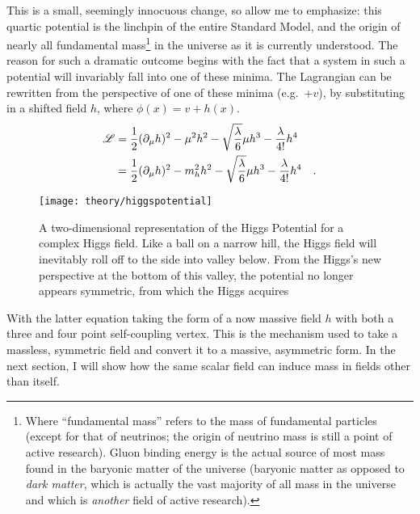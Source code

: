     This is a small, seemingly innocuous change, so allow me to emphasize:
        this quartic potential is the linchpin of the entire Standard Model,
        and the origin of nearly all fundamental mass\footnote{
            Where ``fundamental mass'' refers to the mass of fundamental particles
                (except for that of neutrinos; the origin of neutrino mass is still a point of active research).
            Gluon binding energy is the actual source of most mass found in the baryonic matter of the universe
                (baryonic matter as opposed to \textit{dark matter},
                which is actually the vast majority of all mass in the universe
                and which is \textit{another} field of active research).
        } in the universe as it is currently understood.
    The reason for such a dramatic outcome begins with the fact that
        a system in such a potential will invariably fall into one of these minima.
    The Lagrangian can be rewritten from the perspective of one of these minima (e.g.\ $+v$),
        by substituting in a shifted field $h$, where $\phi(x)=v+h(x)$.
    \begin{equation} \begin{split} \label{eq:basic_higgs}
        \mathscr{L} & = \frac{1}{2} (\partial_{\mu} h)^2
            - \mu^2 h^2
            -\sqrt{\frac{\lambda}{6}} \mu h^3
            - \frac{\lambda}{4!} h^4 \\
         & = \frac{1}{2} (\partial_{\mu} h)^2
            - m^2_{h} h^2
            -\sqrt{\frac{\lambda}{6}} \mu h^3
            - \frac{\lambda}{4!} h^4
        \quad.
    \end{split} \end{equation} %

    \begin{figure}[h!]
        \texttt{[image: theory/higgspotential]}
        \caption{A two-dimensional representation of the Higgs Potential for a complex Higgs field\cite{higgspotential}.
            Like a ball on a narrow hill, the Higgs field will inevitably roll off to the side into valley below.
            From the Higgs's new perspective at the bottom of this valley,
                the potential no longer appears symmetric, from which the Higgs acquires
        }
        \label{fig:higgs_potential}
    \end{figure}


    With the latter equation taking the form of a now massive field $h$ with both a three and four point self-coupling vertex.
    This is the mechanism used to take a massless, symmetric field and convert it to a massive, asymmetric form.
    In the next section, I will show how the same scalar field can induce mass in fields other than itself.


